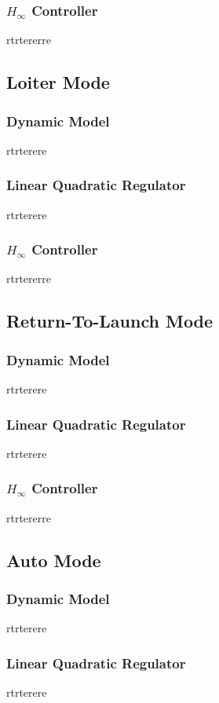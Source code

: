 \subsubsection{$H_\infty$ Controller}
rtrtererre

\subsection{Loiter Mode}
\subsubsection{Dynamic Model}
rtrterere
\subsubsection{Linear Quadratic Regulator}
rtrterere

\subsubsection{$H_\infty$ Controller}
rtrtererre

\subsection{Return-To-Launch Mode}
\subsubsection{Dynamic Model}
rtrterere
\subsubsection{Linear Quadratic Regulator}
rtrterere

\subsubsection{$H_\infty$ Controller}
rtrtererre

\subsection{Auto Mode}

\subsubsection{Dynamic Model}
rtrterere

\subsubsection{Linear Quadratic Regulator}
rtrterere

